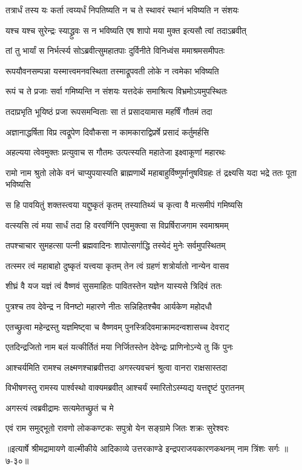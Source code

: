 \twolineshloka
{तत्रार्धं तस्य यः कर्ता त्वय्यर्धं निपतिष्यति}
{न च ते स्थावरं स्थानं भविष्यति न संशयः} %

\twolineshloka
{यश्च यश्च सुरेन्द्रः स्याद्ध्रुवः स न भविष्यति}
{एष शापो मया मुक्त इत्यसौ त्वां तदाऽब्रवीत्} %

\twolineshloka
{तां तु भार्यां स निर्भर्त्स्य सोऽब्रवीत्सुमहातपाः}
{दुर्विनीते विनिध्वंस ममाश्रमसमीपतः} %

\twolineshloka
{रूपयौवनसम्पन्ना यस्मात्त्वमनवस्थिता}
{तस्माद्रूपवती लोके न त्वमेका भविष्यति} %

\twolineshloka
{रूपं च ते प्रजाः सर्वा गमिष्यन्ति न संशयः}
{यत्तदेकं समाश्रित्य विभ्रमोऽयमुपस्थितः} %

\twolineshloka
{तदाप्रभृति भूयिष्ठं प्रजा रूपसमन्विताः}
{सा तं प्रसादयामास महर्षिं गौतमं तदा} %

\twolineshloka
{अज्ञानाद्धर्षिता विप्र त्वद्रूपेण दिवौकसा}
{न कामकाराद्विप्रर्षे प्रसादं कर्तुमर्हसि} %

\twolineshloka
{अहल्यया त्वेवमुक्तः प्रत्युवाच स गौतमः}
{उत्पत्स्यति महातेजा इक्ष्वाकूणां महारथः} %

\threelineshloka
{रामो नाम श्रुतो लोके वनं चाप्युपयास्यति}
{ब्राह्मणार्थे महाबाहुर्विष्णुर्मानुषविग्रहः}
{तं द्रक्ष्यसि यदा भद्रे ततः पूता भविष्यसि} %

\twolineshloka
{स हि पावयितुं शक्तस्त्वया यद्दुष्कृतं कृतम्}
{तस्यातिथ्यं च कृत्वा वै मत्समीपं गमिष्यसि} %

\twolineshloka
{वत्स्यसि त्वं मया सार्धं तदा हि वरवर्णिनि}
{एवमुक्त्वा स विप्रर्षिराजगाम स्वमाश्रमम्} %

\twolineshloka
{तपश्चाचार सुमहत्सा पत्नी ब्रह्मवादिनः}
{शापोत्सर्गाद्धि तस्येदं मुनेः सर्वमुपस्थितम्} %

\twolineshloka
{तत्स्मर त्वं महाबाहो दुष्कृतं यत्त्वया कृतम्}
{तेन त्वं ग्रहणं शत्रोर्यातो नान्येन वासव} %

\twolineshloka
{शीघ्रं वै यज यज्ञं त्वं वैष्णवं सुसमाहितः}
{पावितस्तेन यज्ञेन यास्यसे त्रिदिवं ततः} %

\twolineshloka
{पुत्रश्च तव देवेन्द्र न विनष्टो महारणे}
{नीतः सन्निहितश्चैव आर्यकेण महोदधौ} %

\twolineshloka
{एतच्छ्रुत्वा महेन्द्रस्तु यज्ञमिष्ट्वा च वैष्णवम्}
{पुनस्त्रिदिवमाक्रामदन्वशासच्च देवराट्} %

\twolineshloka
{एतदिन्द्रजितो नाम बलं यत्कीर्तितं मया}
{निर्जितस्तेन देवेन्द्रः प्राणिनोऽन्ये तु किं पुनः} %

\twolineshloka
{आश्चर्यमिति रामश्च लक्ष्मणश्चाब्रवीत्तदा}
{अगस्त्यवचनं श्रुत्वा वानरा राक्षसास्तदा} %

\twolineshloka
{विभीषणस्तु रामस्य पार्श्वस्थो वाक्यमब्रवीत्}
{आश्चर्यं स्मारितोऽस्म्यद्य यत्तद्दृष्टं पुरातनम्} %

\onelineshloka
{अगस्त्यं त्वब्रवीद्रामः सत्यमेतच्छ्रुतं च मे} %

\twolineshloka
{एवं राम समुद्भूतो रावणो लोककण्टकः}
{सपुत्रो येन सङ्ग्रामे जितः शक्रः सुरेश्वरः} %


॥इत्यार्षे श्रीमद्रामायणे वाल्मीकीये आदिकाव्ये उत्तरकाण्डे इन्द्रपराजयकारणकथनम् नाम त्रिंशः सर्गः ॥७-३०॥
